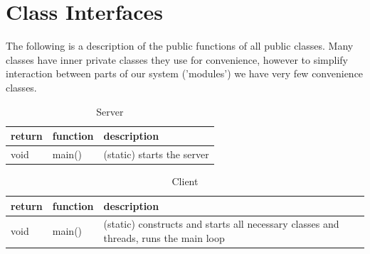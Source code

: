 \section{Class Interfaces}
The following is a description of the public functions of all public classes.
Many classes have inner private classes they use for convenience, however to
simplify interaction between parts of our system ('modules') we have very few
convenience classes.


\begin{table}[h]
    \centering
    \begin{tabular}{p{1cm}p{1cm}p{3cm}}
    return & function & description\\ \hline
    void   & main() & (static) starts the server\\
    \end{tabular}
    \caption{Server}
\end{table}

\begin{table}[h]
    \centering
    \begin{tabular}{p{1cm}p{1cm}p{9cm}}
    return & function & description\\ \hline
    void   & main()   & (static) constructs and starts all necessary classes and threads, runs the main loop\\
    \end{tabular}
    \caption{Client}
\end{table}

